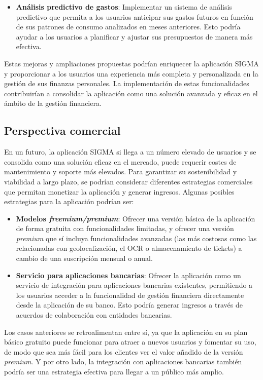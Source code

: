 \begin{itemize}
    \item \textbf{Análisis predictivo de gastos}: Implementar un sistema de análisis predictivo que permita a los usuarios anticipar sus gastos futuros en función de sus patrones de consumo analizados en meses anteriores. Esto podría ayudar a los usuarios a planificar y ajustar sus presupuestos de manera más efectiva.
\end{itemize}

Estas mejoras y ampliaciones propuestas podrían enriquecer la aplicación SIGMA y proporcionar a los usuarios una experiencia más completa y personalizada en la gestión de sus finanzas personales. La implementación de estas funcionalidades contribuirían a consolidar la aplicación como una solución avanzada y eficaz en el ámbito de la gestión financiera.


\subsection{Perspectiva comercial}
En un futuro, la aplicación SIGMA si llega a un número elevado de usuarios y se consolida como una solución eficaz en el mercado, puede requerir costes de mantenimiento y soporte más elevados. Para garantizar su sostenibilidad y viabilidad a largo plazo, se podrían considerar diferentes estrategias comerciales que permitan monetizar la aplicación y generar ingresos. Algunas posibles estrategias para la aplicación podrían ser:

\begin{itemize}
    \item \textbf{Modelos \textit{freemium/premium}}: Ofrecer una versión básica de la aplicación de forma gratuita con funcionalidades limitadas, y ofrecer una versión \textit{premium} que sí incluya funcionalidades avanzadas (las más costosas como las relacionadas con geolocalización, el OCR o almacenamiento de tickets) a cambio de una suscripción mensual o anual.
    \item \textbf{Servicio para aplicaciones bancarias}: Ofrecer la aplicación como un servicio de integración para aplicaciones bancarias existentes, permitiendo a los usuarios acceder a la funcionalidad de gestión financiera directamente desde la aplicación de su banco. Esto podría generar ingresos a través de acuerdos de colaboración con entidades bancarias.
\end{itemize}

Los casos anteriores se retroalimentan entre sí, ya que la aplicación en su plan básico gratuito puede funcionar para atraer a nuevos usuarios y fomentar su uso, de modo que sea más fácil para los clientes ver el valor añadido de la versión \textit{premium}. Y por otro lado, la integración con aplicaciones bancarias también podría ser una estrategia efectiva para llegar a un público más amplio.

